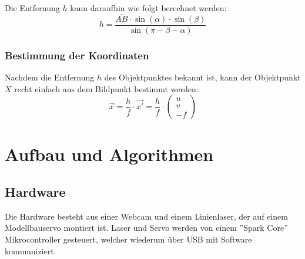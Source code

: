 \documentclass[ngerman,a4paper,parskip=half]{scrartcl}
\begin{document}
Die Entfernung $h$ kann daraufhin wie folgt berechnet werden:
\[ h = \frac{\overline{AB} \cdot \sin(\alpha) \cdot \sin(\beta)}{\sin(\pi - \beta - \alpha)} \]

\subsubsection{Bestimmung der Koordinaten}

Nachdem die Entfernung $h$ des Objektpunktes bekannt ist, kann der Objektpunkt $X$ recht einfach aus dem Bildpunkt bestimmt werden:
\[ \vec{x} = \frac{h}{f} \cdot \vec{x'} = \frac{h}{f} \cdot \begin{pmatrix}
u \\ v \\ -f
\end{pmatrix} \]


\section{Aufbau und Algorithmen}

\subsection{Hardware}

Die Hardware besteht aus einer Webcam und einem Linienlaser, der auf einem Modellbauservo montiert ist. Laser und Servo werden von einem ''Spark Core'' Mikrocontroller gesteuert, welcher wiederum über USB mit Software kommuniziert.
\end{document}
